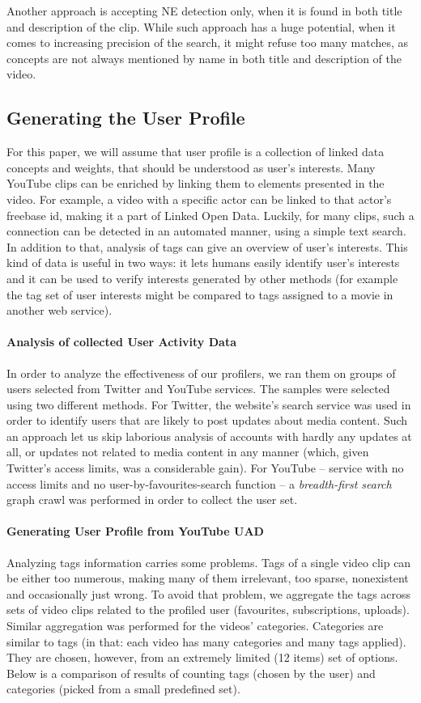 Another approach is accepting NE detection only, when it is found in both title
and description of the clip. While such approach has a huge potential, when it
comes to increasing precision of the search, it might refuse too many matches,
as concepts are not always mentioned by name in both title and description of
the video.

\subsection{Generating the User Profile}

For this paper, we will assume that user profile is a collection of linked data concepts and weights,
that should be understood as user's interests. Many YouTube clips can be
enriched by linking them to elements presented in the video. For example, a
video with a specific actor can be linked to that actor's freebase id, making it
a part of Linked Open Data. Luckily, for many clips, such a connection can be
detected in an automated manner, using a simple text search.
In addition to that, analysis of tags can give an overview of user's interests. This kind of data is
useful in two ways: it lets humans easily identify user's interests and it can be
used to verify interests generated by other methods (for example the tag set
of user interests might be compared to tags assigned to a movie in another web
service).

\paragraph{Analysis of collected User Activity Data}
In order to analyze the effectiveness of our profilers, we ran them on groups of
users selected from Twitter and YouTube services. The samples were selected
using two different methods. For Twitter, the website's search service was used
in order to identify users that are likely to post updates about media content.
Such an approach let us skip laborious analysis of accounts with hardly any
updates at all, or updates not related to media content in any manner (which,
given Twitter's access limits, was a considerable gain). For YouTube -- service
with no access limits and no user-by-favourites-search function -- a \textit{breadth-first search}
graph crawl was performed in order to collect the user set.

\paragraph{Generating User Profile from YouTube UAD}
Analyzing tags information carries some problems. Tags of a single video clip
can be either too numerous, making many
of them irrelevant, too sparse, nonexistent and occasionally just wrong. To avoid
that problem, we aggregate the tags across sets of video clips related to the
profiled user (favourites, subscriptions, uploads). Similar aggregation was
performed for the videos' categories. Categories are similar to tags (in that:
each video has many categories and many tags applied). They are chosen,
however, from an extremely limited (12 items) set
of options.  Below is a comparison of results of counting
tags (chosen by the user) and categories (picked from a small predefined set).


